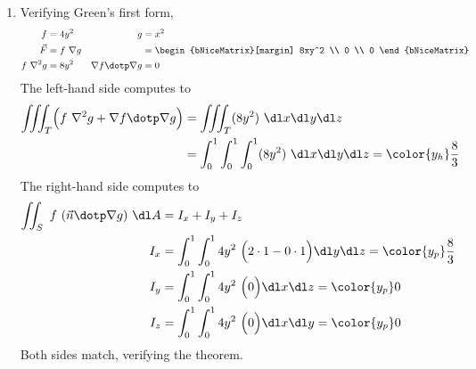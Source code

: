 \begin{enumerate}
    \item Verifying Green's first form,
          \begin{align}
              f                       & = 4y^2                         &
              g                       & =  x^2                           \\
              \vec{F}                 & = f\ \nabla g                  &
                                      & =  \begin{bNiceMatrix}[margin]
                                               8xy^2 \\ 0 \\ 0
                                           \end{bNiceMatrix}    \\
              f\ \nabla^2 g           & = 8y^2                         &
              \nabla f \dotp \nabla g & = 0
          \end{align}
          The left-hand side computes to
          \begin{align}
              \iiint_T \Bigl( f\ \nabla^2 g + \nabla f \dotp \nabla g \Bigr)
               & = \iiint_T (8y^2)\ \dl x \dl y \dl z                               \\
               & = \int_{0}^{1} \int_{0}^{1} \int_{0}^{1} (8y^2)\ \dl x \dl y \dl z
              = \color{y_h} \frac{8}{3}
          \end{align}
          The right-hand side computes to
          \begin{align}
              \iint_S\ f\ (\vec{n} \dotp \nabla g)\ \dl A
                  & = I_x + I_y + I_z                                  \\
              I_x & = \int_{0}^{1} \int_{0}^{1} 4y^2\ \Bigl( 2 \cdot 1
              - 0 \cdot 1 \Bigr) \dl y \dl z = \color{y_p} \frac{8}{3} \\
              I_y & = \int_{0}^{1} \int_{0}^{1} 4y^2\ \Bigl( 0
              \Bigr) \dl x \dl z = \color{y_p} 0                       \\
              I_z & = \int_{0}^{1} \int_{0}^{1} 4y^2\ \Bigl( 0
              \Bigr) \dl x \dl y = \color{y_p} 0
          \end{align}
          Both sides match, verifying the theorem.


\end{enumerate}
